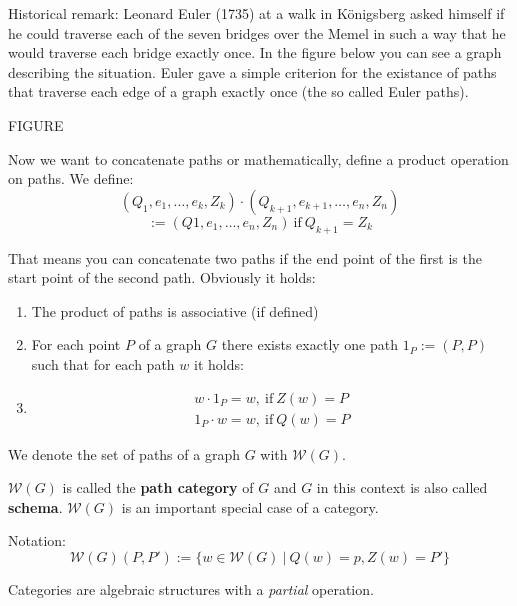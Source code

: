 Historical remark: Leonard Euler (1735) at a walk in Königsberg asked himself if
he could traverse each of the seven bridges over the Memel in such
a way that he would traverse each bridge exactly once. In the figure below you
can see a graph describing the situation. Euler gave a simple criterion for the
existance of paths that traverse each edge of a graph exactly once (the so
called Euler paths).

FIGURE

Now we want to concatenate paths or mathematically, define a product operation
on paths. We define:
\[ (Q_1, e_1, \ldots, e_k, Z_k) \cdot (Q_{k+1}, e_{k+1}, \ldots, e_n, Z_n) \]
\[:= (Q1,e_1, \ldots, e_n, Z_n)\ \mbox{if}\ Q_{k+1} = Z_k \]

That means you can concatenate two paths if the end point of the first is the
start point of the second path. Obviously it holds:

\begin{enumerate}
  \item The product of paths is associative (if defined)
  \item For each point $P$ of a graph $G$ there exists exactly one path $1_P :=
  (P, P)$ such that for each path $w$ it holds:
  \item
  	\begin{eqnarray*}
    	w \cdot 1_P = w,\ \mbox{if}\ Z(w) = P \\
    	1_P \cdot w = w,\ \mbox{if}\ Q(w) = P
  	\end{eqnarray*}
\end{enumerate}

We denote the set of paths of a graph $G$ with $\mathcal{W}(G)$.

$\mathcal{W}(G)$ is called the {\bf path category} of $G$ and $G$ in this
context is also called {\bf schema}. $\mathcal{W}(G)$ is an important special
case of a category.

Notation: \[ \mathcal{W}(G)(P,P') := \{ w \in \mathcal{W}(G)\ |\ Q(w) = p, Z(w)
= P' \} \]

Categories are algebraic structures with a {\em partial} operation.

